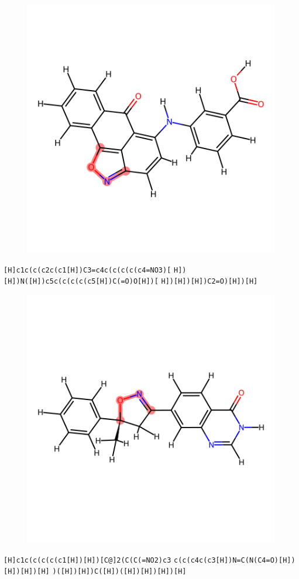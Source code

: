 \documentclass{article}
\begin{document}
\begin{figure}[ht]
\centering
    \includegraphics{mol138.png}
\end{figure}
\verb|[H]c1c(c(c2c(c1[H])C3=c4c(c(c(c(c4=NO3)[| \verb|H])[H])N([H])c5c(c(c(c(c5[H])C(=O)O[H])[| \verb|H])[H])[H])C2=O)[H])[H]|

\begin{figure}[ht]
\centering
    \includegraphics{mol139.png}
\end{figure}
\verb|[H]c1c(c(c(c(c1[H])[H])[C@]2(C(C(=NO2)c3| \verb|c(c(c4c(c3[H])N=C(N(C4=O)[H])[H])[H])[H]| \verb|)([H])[H])C([H])([H])[H])[H])[H]|
\end{document}
